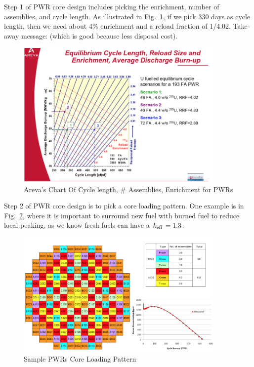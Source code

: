 \documentclass{school-22.211-notes}
\begin{document}
\clearpage
{}
Step 1 of PWR core design includes picking the enrichment, number of assemblies, and cycle length. As illustrated in Fig.~\ref{areva-lattice-design}, if we pick 330 days as cycle length, then we need about 4\% enrichment and a reload fraction of 1/4.02. Take-away message:  (which is good because less disposal cost). 

  \begin{figure}[ht]
    \centering
    \includegraphics[width=4in]{images/design/areva-lattice-design.png}
    \caption{Areva's Chart Of Cycle length, \# Assemblies, Enrichment for PWRs} \label{areva-lattice-design}
  \end{figure}


Step 2 of PWR core design is to pick a core loading pattern. One example is in Fig.~\ref{PWR-core-loading}, where it is important to surround new fuel with burned fuel to reduce local peaking, as we know fresh fuels can have a $\left. k_{\mathrm{eff}} \right. = 1.3$. 

\begin{figure}[ht]
  \centering
  \includegraphics[width=4in]{images/design/PWR-core-loading.png}
  \caption{Sample PWRs Core Loading Pattern} \label{PWR-core-loading}
\end{figure}
\end{document}
